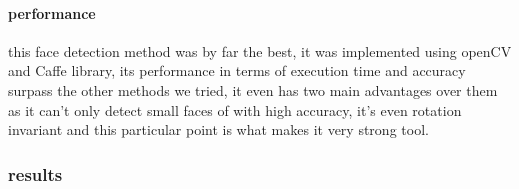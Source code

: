 \paragraph{performance}
this face detection method was by far the best, it was implemented using openCV and Caffe library, its performance in terms of execution time and accuracy surpass the other methods we tried, it even has two main advantages over them as it can't only detect small faces of with high accuracy, it's even rotation invariant and this particular point is what makes it very strong tool.

\subsubsection{results}